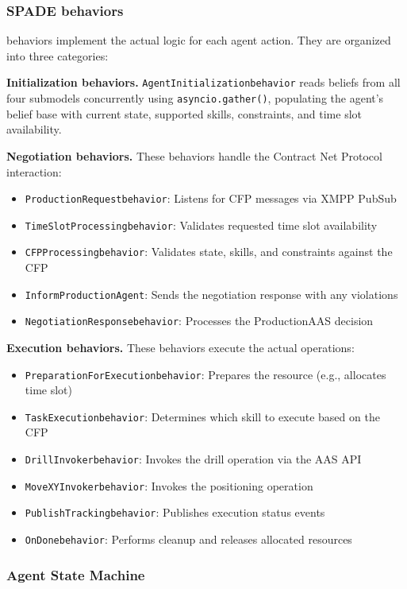 \subsubsection{SPADE behaviors}

behaviors implement the actual logic for each agent action. They are organized into three categories:

\textbf{Initialization behaviors.} \texttt{AgentInitializationbehavior} reads beliefs from all four submodels concurrently using \texttt{asyncio.gather()}, populating the agent's belief base with current state, supported skills, constraints, and time slot availability.

\textbf{Negotiation behaviors.} These behaviors handle the Contract Net Protocol interaction:
\begin{itemize}
    \item \texttt{ProductionRequestbehavior}: Listens for CFP messages via \ac{XMPP} PubSub
    \item \texttt{TimeSlotProcessingbehavior}: Validates requested time slot availability
    \item \texttt{CFPProcessingbehavior}: Validates state, skills, and constraints against the CFP
    \item \texttt{InformProductionAgent}: Sends the negotiation response with any violations
    \item \texttt{NegotiationResponsebehavior}: Processes the ProductionAAS decision
\end{itemize}

\textbf{Execution behaviors.} These behaviors execute the actual operations:
\begin{itemize}
    \item \texttt{PreparationForExecutionbehavior}: Prepares the resource (e.g., allocates time slot)
    \item \texttt{TaskExecutionbehavior}: Determines which skill to execute based on the CFP
    \item \texttt{DrillInvokerbehavior}: Invokes the drill operation via the \ac{AAS} API
    \item \texttt{MoveXYInvokerbehavior}: Invokes the positioning operation
    \item \texttt{PublishTrackingbehavior}: Publishes execution status events
    \item \texttt{OnDonebehavior}: Performs cleanup and releases allocated resources
\end{itemize}


\subsubsection{Agent State Machine}

